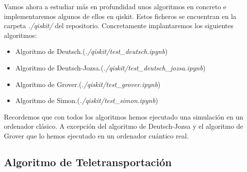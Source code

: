 \documentclass[a4paper]{article}
\numberwithin{equation}{section}
\begin{document}
Vamos ahora a estudiar más en profundidad unos algoritmos en concreto e implementaremos algunos de ellos en qiskit. Estos ficheros se encuentran en la carpeta \textit{./qiskit/} del repositorio. Concretamente implantaremos los siguientes algoritmos:
\begin{itemize}
\item Algoritmo de Deutsch.(\textit{./qiskit/test\_deutsch.ipynb})

\item Algoritmo de Deutsch-Jozsa.(\textit{./qiskit/test\_deutsch\_jozsa.ipynb})

\item Algoritmo de Grover.(\textit{./qiskit/test\_grover.ipynb})

\item Algoritmo de Simon.(\textit{./qiskit/test\_simon.ipynb})
\end{itemize}
Recordemos que con todos los algoritmos hemos ejecutado una simulación en un ordenador clásico. A excepción del algoritmo de Deutsch-Jozsa y el algoritmo de Grover que lo hemos ejecutado en un ordenador cuántico real.


\subsection{Algoritmo de Teletransportación}
\end{document}
